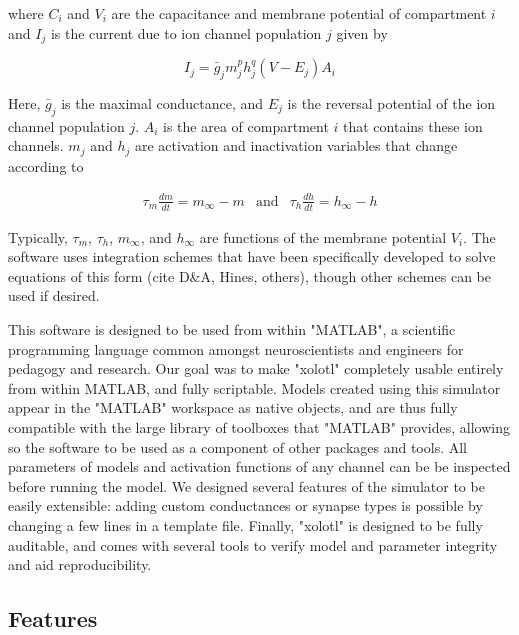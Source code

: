 \documentclass{frontiersSCNS} %
\begin{document}
where \( C_{i} \) and  \( V_{i} \) are the capacitance and membrane potential of compartment  \( i \) and \( I_{j} \) is the current due to ion channel population \( j \) given by 

\begin{equation}
I_{j}=\bar{g}_{j}m_{j}^{p}h_{j}^{q}(V-E_{j})A_{i}  \label{eq:2}
\end{equation}

Here, \( \bar{g}_{j} \) is the maximal conductance, and \( E_{j} \) is the reversal potential of the ion channel population \( j \). \( A_{i} \) is the area of compartment \( i\) that contains these ion channels.  \( m_{j} \) and \( h_{j} \) are activation and inactivation variables that change according to

\begin{eqnarray*}
\tau_{m}\frac{dm}{dt}=m_{\infty}-m & \mathrm{and} & \tau_{h}\frac{dh}{dt}=h_{\infty}-h
\end{eqnarray*}

Typically, \( \tau_{m} \), \( \tau_{h} \), \( m_{\infty} \), and \( h_{\infty} \) are functions of the membrane potential \( V_{i} \). The software uses integration schemes that have been specifically developed to solve equations of this form (cite D\&A, Hines, others), though other schemes can be used if desired.   

This software is designed to be used from within "MATLAB", a scientific programming language common amongst neuroscientists and engineers for pedagogy and research. Our goal was to make "xolotl" completely usable entirely from within MATLAB, and fully scriptable. Models created using this simulator appear in the "MATLAB" workspace as native objects, and are thus fully compatible with the large library of toolboxes that "MATLAB" provides, allowing so the software to be used as a component of other packages and tools. All parameters of models and activation functions of any channel can be be inspected before running the model. We designed several features of the simulator to be easily extensible: adding custom conductances or synapse types is possible by changing a few lines in a template file. Finally, "xolotl" is designed to be fully auditable, and comes with several tools to verify model and parameter integrity and aid reproducibility. 



\subsection{Features}
\label{features}
\end{document}
